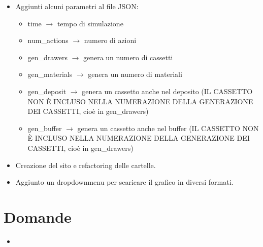 \documentclass[a4paper]{article}
\begin{document}
\begin{itemize}[label=]
		\item Aggiunti alcuni parametri al file JSON:
		\begin{itemize}
			\item time $\rightarrow$ tempo di simulazione
			\item num\_actions $\rightarrow$ numero di azioni
			\item gen\_drawers $\rightarrow$ genera un numero di cassetti
			\item gen\_materials $\rightarrow$ genera un numero di materiali
			\item gen\_deposit $\rightarrow$ genera un cassetto anche nel deposito (IL CASSETTO NON È INCLUSO NELLA NUMERAZIONE DELLA GENERAZIONE DEI CASSETTI, cioè in gen\_drawers)
			\item gen\_buffer $\rightarrow$ genera un cassetto anche nel buffer (IL CASSETTO NON È INCLUSO NELLA NUMERAZIONE DELLA GENERAZIONE DEI CASSETTI, cioè in gen\_drawers)
		\end{itemize}

		\item Creazione del sito e refactoring delle cartelle.

		\item Aggiunto un dropdownmenu per scaricare il grafico in diversi formati.
	\end{itemize}
	
	\section*{Domande}
	\begin{itemize}
		\item
	\end{itemize}
\end{document}
